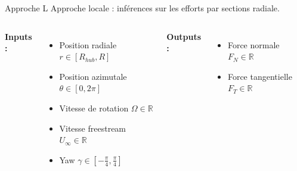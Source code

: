 \documentclass[
11pt,notheorems,hyperref={pdfauthor=whatever}
]{beamer}
\begin{document}
\begin{frame}{Approche L}
    Approche locale : inférences sur les efforts par sections radiale. 

    \vspace{0.3cm}

    \begin{columns}[c]
        \textbf{Inputs :}
        \begin{itemize}\small
            \item Position radiale $r \in \left[R_{hub}, R\right]$
            \item Position azimutale $\theta \in \left[0,2\pi\right]$
            \item Vitesse de rotation $\Omega \in \mathbb{R}$
            \item Vitesse freestream $U_{\infty} \in \mathbb{R}$
            \item Yaw $\gamma \in \left[-\frac{\pi}{4}, \frac{\pi}{4}\right]$
        \end{itemize}

        \centering

        \textbf{Outputs :}
        \begin{itemize}\small
            \item Force normale $F_N \in \mathbb{R}$
            \item Force tangentielle $F_T \in \mathbb{R}$
        \end{itemize}
    \end{columns}
\end{frame}
\end{document}
